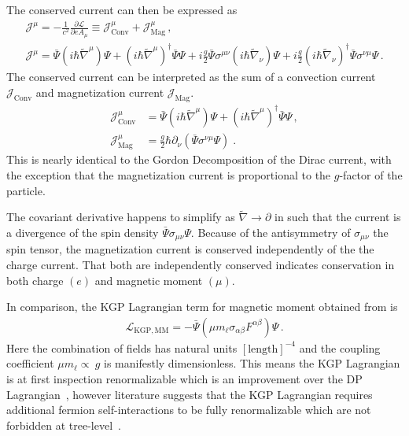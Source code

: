 The conserved current can then be expressed as
\begin{gather}
\label{norm:2}
\mathcal{J}^{\mu}=-\frac{1}{c^{2}}\frac{\partial\mathcal{L}}{\partial eA_{\mu}}\equiv 
 \mathcal{J}^\mu_{\mathrm{Conv}}+\mathcal{J}^\mu_{\mathrm{Mag}}\,, \\
\mathcal{J}^{\mu}=\bar{\Psi}\left(i\hbar{\widetilde\nabla}^{\mu}\right)\Psi + \left(i\hbar{\widetilde\nabla}^{\mu}\right)^{\dag}\bar{\Psi}\Psi + i\frac{g}{2}\bar{\Psi}\sigma^{\mu\nu}\left(i\hbar{\widetilde\nabla}_{\nu}\right)\Psi + i\frac{g}{2}\left(i\hbar{\widetilde\nabla}_{\nu}\right)^{\dag}\bar{\Psi}\sigma^{\nu\mu}\Psi\,.
\end{gather}
The conserved current  can be interpreted as the sum of a convection current $\mathcal{J}_{\mathrm{Conv}}$ and magnetization current $\mathcal{J}_{\mathrm{Mag}}$.
\begin{align}
\label{norm:3a}\mathcal{J}^{\mu}_{\mathrm{Conv}}&=\bar{\Psi}\left(i\hbar{\widetilde\nabla}^{\mu}\right)\Psi + \left(i\hbar{\widetilde\nabla}^{\mu}\right)^{\dag}\bar{\Psi}\Psi\,,\\
\label{norm:3b} 
\mathcal{J}^{\mu}_{\mathrm{Mag}}&=\frac{g}{2}\hbar{\partial}_{\nu}\left(\bar{\Psi}\sigma^{\nu\mu}\Psi\right)\;.
\end{align}
 This is nearly identical to the Gordon Decomposition of the Dirac current, with the exception that the magnetization current is proportional to the $g$-factor of the particle.
 
The covariant derivative happens to simplify as $\widetilde\nabla\rightarrow\partial$ in  such that the current is a divergence of the spin density $\bar\Psi\sigma_{\mu\nu}\Psi$. Because of the antisymmetry of $\sigma_{\mu\nu}$ the spin tensor, the magnetization current is conserved independently of the the charge current. That both are independently conserved indicates conservation in both charge $(e)$ and magnetic moment $(\mu)$.

In comparison, the KGP Lagrangian term for magnetic moment obtained from  is
\begin{align}
    \label{lagrangian:2}
    \mathcal{L}_\mathrm{KGP,MM} = -{\bar\Psi}\left(\mu m_{\ell}\sigma_{\alpha\beta}F^{\alpha\beta}\right)\Psi\,.
\end{align}
Here the combination of fields has natural units $[\mathrm{length}]^{-4}$ and the coupling coefficient $\mu m_{\ell}\!\propto\!~g$ is manifestly dimensionless. This means the KGP Lagrangian is at first inspection renormalizable which is an improvement over the DP Lagrangian~\citep{Rafelski:2022bsv}, however literature suggests that the KGP Lagrangian requires additional fermion self-interactions to be fully renormalizable which are not forbidden at tree-level~\citep{Angeles-Martinez:2011wpn,Vaquera-Araujo:2012jlk}.

